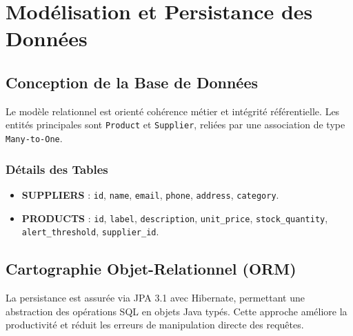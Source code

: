 \documentclass[12pt,a4paper]{report}
\begin{document}
\chapter{Modélisation et Persistance des Données}

\section{Conception de la Base de Données}
Le modèle relationnel est orienté cohérence métier et intégrité référentielle. Les entités principales sont \texttt{Product} et \texttt{Supplier}, reliées par une association de type \texttt{Many-to-One}.

\subsection{Détails des Tables}
\begin{itemize}
    \item \textbf{SUPPLIERS} : \texttt{id}, \texttt{name}, \texttt{email}, \texttt{phone}, \texttt{address}, \texttt{category}.
    \item \textbf{PRODUCTS} : \texttt{id}, \texttt{label}, \texttt{description}, \texttt{unit\_price}, \texttt{stock\_quantity}, \texttt{alert\_threshold}, \texttt{supplier\_id}.
\end{itemize}

\begin{center}
\end{center}

\section{Cartographie Objet-Relationnel (ORM)}
La persistance est assurée via JPA 3.1 avec Hibernate, permettant une abstraction des opérations SQL en objets Java typés. Cette approche améliore la productivité et réduit les erreurs de manipulation directe des requêtes.
\end{document}
